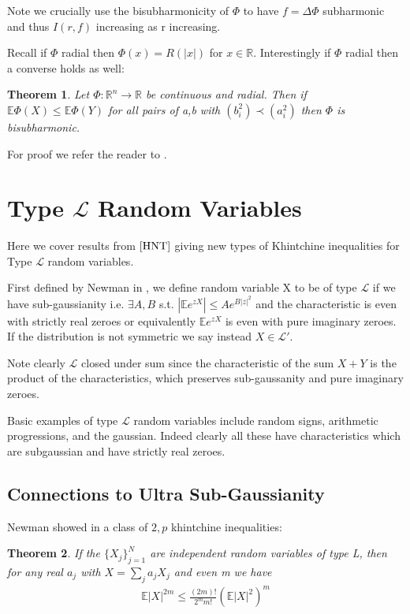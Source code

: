 \documentclass[10pt]{article}
\newcommand{\E}{\mathbb{E}}
\newcommand{\1}{\textbf{1}}
\newcommand{\R}{\mathbb{R}}
\newtheorem{theorem}{Theorem}
\theoremstyle{remark}
\theoremstyle{definition}
\begin{document}
Note we crucially use the bisubharmonicity of $\Phi$ to have $f = \Delta \Phi$ subharmonic and thus $I(r,f)$ increasing as r increasing. 

Recall if $\Phi$ radial then $\Phi(x) = R(|x|)$ for $x \in \R$. Interestingly if $\Phi$ radial then a converse holds as well:

\begin{theorem}
	Let $\Phi : \R^n \to \R$ be continuous and radial. Then if $\E \Phi(X) \leq \E \Phi(Y)$ for all pairs of a,b with $(b_i^2) \prec (a_i^2)$ then $\Phi$ is bisubharmonic.
\end{theorem}

For proof we refer the reader to \cite{BC}.

\newpage

\section{Type $\mathcal{L}$ Random Variables}

Here we cover results from $\cite{HNT}$ giving new types of Khintchine inequalities for Type $\mathcal{L}$ random variables.

First defined by Newman in \cite{N}, we define random variable X to be of type $\mathcal{L}$ if we have sub-gaussianity i.e. $\exists A,B$ s.t. $|\E e^{z X}| \leq A e^{B|z|^2}$ and the characteristic is even with strictly real zeroes or equivalently $\E e^{zX}$ is even with pure imaginary zeroes. If the distribution is not symmetric we say instead $X \in \mathcal{L}'$. 

Note clearly $\mathcal{L}$ closed under sum since the characteristic of the sum $X+Y$ is the product of the characteristics, which preserves sub-gaussanity and pure imaginary zeroes. 

Basic examples of type $\mathcal{L}$ random variables include random signs, arithmetic progressions, and the gaussian. Indeed clearly all these have characteristics which are subgaussian and have strictly real zeroes. 

\subsection{Connections to Ultra Sub-Gaussianity}

Newman showed in \cite{N} a class of $2,p$ khintchine inequalities:

\begin{theorem}
	If the $\{X_j\}_{j=1}^N$ are independent random variables of type L, then for any real $a_j$ with $X= \sum_j a_j X_j$ and even m we have
	\begin{align*}
		\E|X|^{2m} \leq \frac{(2m)!}{2^mm!}(\E|X|^2)^m
	\end{align*}
\end{theorem}
\end{document}
